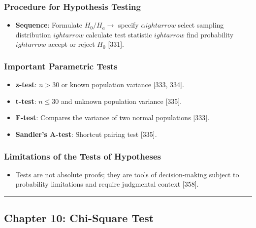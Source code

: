 \documentclass[
]{article}
\providecommand{\tightlist}{%
  \setlength{\itemsep}{0pt}\setlength{\parskip}{0pt}}
\begin{document}
\subsubsection{Procedure for Hypothesis
Testing}\label{procedure-for-hypothesis-testing}

\begin{itemize}
\tightlist
\item
  \textbf{Sequence}: Formulate \(H_0/H_a \rightarrow\) specify
  \(\alpha ightarrow\) select sampling distribution \(ightarrow\)
  calculate test statistic \(ightarrow\) find probability \(ightarrow\)
  accept or reject \(H_0\) {[}331{]}.
\end{itemize}

\subsubsection{Important Parametric
Tests}\label{important-parametric-tests}

\begin{itemize}
\tightlist
\item
  \textbf{z-test}: \(n > 30\) or known population variance {[}333,
  334{]}.
\item
  \textbf{t-test}: \(n \le 30\) and unknown population variance
  {[}335{]}.
\item
  \textbf{F-test}: Compares the variance of two normal populations
  {[}333{]}.
\item
  \textbf{Sandler's A-test}: Shortcut pairing test {[}335{]}.
\end{itemize}

\subsubsection{Limitations of the Tests of
Hypotheses}\label{limitations-of-the-tests-of-hypotheses}

\begin{itemize}
\tightlist
\item
  Tests are not absolute proofs; they are tools of decision-making
  subject to probability limitations and require judgmental context
  {[}358{]}.
\end{itemize}

\begin{center}\rule{0.5\linewidth}{0.5pt}\end{center}

\subsection{Chapter 10: Chi-Square
Test}\label{chapter-10-chi-square-test}
\end{document}
